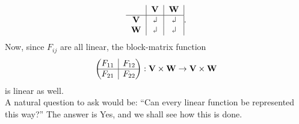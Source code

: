 \documentclass{book}
\theoremstyle{definition}
\newcommand{\V}{\mathbf{V}}
\newcommand{\W}{\mathbf{W}}
\newcommand{\gives}{\rotatebox[origin=c]{180}{$\Rsh$}	}
\newcommand{\rvline}{\hspace*{-\arraycolsep}\vline\hspace*{-\arraycolsep}}
\begin{document}
\begin{align*}
\begin{tabular}{c|c|c|}
	& $\V$ & $\W$\\
	\hline
$\V$& $\gives$& $\gives$\\	
$\W$& $\gives$ & $\gives$
\end{tabular}.
\end{align*}
Now, since $F_{ij}$ are all linear, the block-matrix function 
\begin{align*}
\begin{pmatrix}
\begin{matrix}
F_{11}
\end{matrix}
& \rvline & F_{12} \\
\hline
F_{21} & \rvline &
F_{22}
\end{pmatrix} : \V \times \W \to \V \times \W
\end{align*}
is linear as well. \\

A natural question to ask would be: ``Can every linear function be represented this way?'' The answer is Yes, and we shall see how this is done. \\
\end{document}
